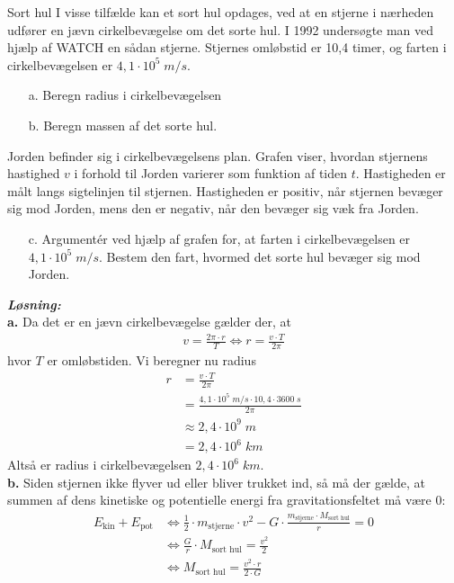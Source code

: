 \documentclass{report}
\newcommand{\sol}{\setlength{\parindent}{0cm}\textbf{\textit{Løsning:}}\setlength{\parindent}{1cm}}
\begin{document}
\begin{question}{Sort hul}{}
I visse tilfælde kan et sort hul opdages, ved at en stjerne i nærheden udfører en jævn cirkelbevægelse om det sorte hul. I 1992 undersøgte man ved hjælp af WATCH en sådan stjerne. Stjernes omløbstid er 10,4 timer, og farten i cirkelbevægelsen er $4,1 \cdot 10^5 \;\unit{m/s} $.
\begin{itemize}
  \item[a.] Beregn radius i cirkelbevægelsen
  \item[b.] Beregn massen af det sorte hul.
\end{itemize}
Jorden befinder sig i cirkelbevægelsens plan. Grafen viser, hvordan stjernens hastighed $v$ i forhold til Jorden varierer som funktion af tiden $t$. Hastigheden er målt langs sigtelinjen til stjernen. Hastigheden er positiv, når stjernen bevæger sig mod Jorden, mens den er negativ, når den bevæger sig væk fra Jorden.
\begin{itemize}
  \item[c.] 
Argumentér ved hjælp af grafen for, at farten i cirkelbevægelsen er $4,1 \cdot  10^{5} \;\unit{m/s} $. Bestem den fart, hvormed det sorte hul bevæger sig mod Jorden. 
\end{itemize}
\end{question}
\sol \\
\textbf{a.}
Da det er en jævn cirkelbevægelse gælder der, at 
\begin{equation*}
\begin{split}
  v=\frac{2 \pi \cdot r}{T} \iff r=\frac{v \cdot T}{2 \pi }
\end{split}
\end{equation*}
hvor $T$ er omløbstiden. 
Vi beregner nu radius 
\begin{equation*}
\begin{split}
  r&=\frac{v \cdot T}{2 \pi }\\
  &=\frac{4,1 \cdot 10^5 \;\unit{m/s} \cdot 10,4 \cdot 3600 \;\unit{s} }{2 \pi }\\
  &\approx 2,4 \cdot 10^9 \;\unit{m} \\
  &=2,4 \cdot 10^6 \;\unit{km} 
\end{split}
\end{equation*}
Altså er radius i cirkelbevægelsen $2,4 \cdot 10^6 \;\unit{km} $. \\[1ex]
\textbf{b.}
Siden stjernen ikke flyver ud eller bliver trukket ind, så må der gælde, at summen af dens kinetiske og potentielle energi fra gravitationsfeltet må være $0$:
\begin{equation*}
\begin{split}
  E_{\text{kin} }+E _{\text{pot} } &\iff \frac{1}{2} \cdot m_{\text{stjerne} } \cdot v^2 - G \cdot \frac{m_{\text{stjerne} } \cdot M _{\text{sort hul} }}{r}=0\\
  &\iff \frac{G}{r} \cdot M _{\text{sort hul} }=\frac{v^2}{2}\\
  &\iff M _{\text{sort hul} }= \frac{v^2 \cdot r}{2 \cdot G}
\end{split}
\end{equation*}
\end{document}
